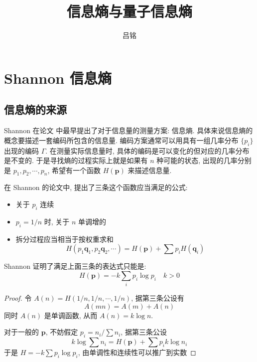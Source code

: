 \documentclass[12pt,a4paper]{article}
\title{信息熵与量子信息熵}
\author{吕铭}
\renewcommand*{\vec}[1]{\bm{#1}}
\newtheorem{proof}{证明}
\begin{document}
\maketitle

\section{Shannon 信息熵} %
\label{sec:Shannon_entropy}
\subsection{信息熵的来源} %
\label{ssub:The_concept}
Shannon 在论文\cite{Shannonentropy} 中最早提出了对于信息量的测量方案: 
信息熵. 具体来说信息熵的概念要描述一套编码所包含的信息量. 
编码方案通常可以用具有一组几率分布 $\{p_i\}$ 出现的编码 $\Gamma$. 
在测量实际信息量时, 具体的编码是可以变化的但对应的几率分布是不变的. 
于是寻找熵的过程实际上就是如果有 $n$ 种可能的状态, 
出现的几率分别是 $p_1, p_2, \cdots, p_n$, 希望有一个函数 $H(\vec p)$ 来描述信息量.

在 Shannon 的论文中, 提出了三条这个函数应当满足的公式\cite{Shannonentropy}:
    \begin{itemize}
        \item 关于 $p_i$ 连续
        \item $p_i = 1/n$ 时, 关于 $n$ 单调增的
        \item 拆分过程应当相当于按权重求和
        \begin{equation}
            H(p_1\vec q_1, p_2\vec q_2, \cdots) = H(\vec p) + \sum p_iH(\vec q_i)
        \end{equation}
    \end{itemize}

    Shannon 证明了满足上面三条的表达式只能是:
    \begin{equation}
        H(\vec p) = -k\sum_i p_i\log p_i\quad k>0
    \end{equation}
    \begin{proof}
        令 $A(n) = H(1/n,1/n,\cdots,1/n)$, 据第三条公设有
        \begin{equation}
            A(mn) = A(m) + A(n)
        \end{equation}
        同时 $A(n)$ 是单调函数, 从而 $A(n) = k\log n$.

        对于一般的 $\vec p$, 不妨假定 $p_i = n_i/\sum n_i$, 据第三条公设
        \begin{equation}
            k\log\sum n_i = H(\vec p) + \sum p_i k\log n_i
        \end{equation}
        于是 $H = -k\sum p_i\log p_i$, 由单调性和连续性可以推广到实数
    \end{proof}
\end{document}
